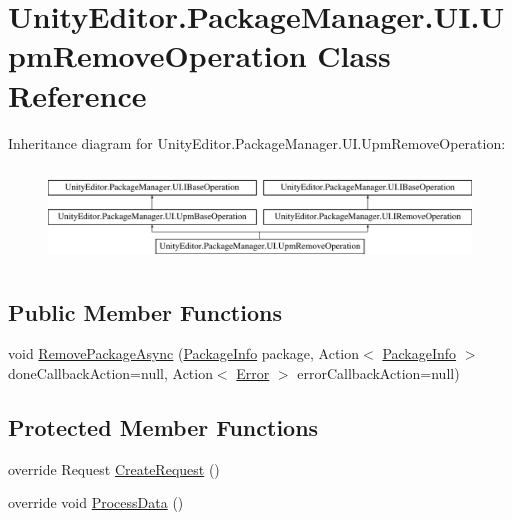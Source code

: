 \hypertarget{class_unity_editor_1_1_package_manager_1_1_u_i_1_1_upm_remove_operation}{}\section{Unity\+Editor.\+Package\+Manager.\+U\+I.\+Upm\+Remove\+Operation Class Reference}
\label{class_unity_editor_1_1_package_manager_1_1_u_i_1_1_upm_remove_operation}
Inheritance diagram for Unity\+Editor.\+Package\+Manager.\+U\+I.\+Upm\+Remove\+Operation\+:\begin{figure}[H]
\begin{center}
\leavevmode
\includegraphics[height=2.553191cm]{class_unity_editor_1_1_package_manager_1_1_u_i_1_1_upm_remove_operation}
\end{center}
\end{figure}
\subsection*{Public Member Functions}
\begin{DoxyCompactItemize}
\item 
void \mbox{\hyperlink{class_unity_editor_1_1_package_manager_1_1_u_i_1_1_upm_remove_operation_ae89c3c2cc15ae8f769276685b775eea6}{Remove\+Package\+Async}} (\mbox{\hyperlink{class_unity_editor_1_1_package_manager_1_1_u_i_1_1_package_info}{Package\+Info}} package, Action$<$ \mbox{\hyperlink{class_unity_editor_1_1_package_manager_1_1_u_i_1_1_package_info}{Package\+Info}} $>$ done\+Callback\+Action=null, Action$<$ \mbox{\hyperlink{class_unity_editor_1_1_package_manager_1_1_u_i_1_1_upm_base_operation_a116dcc466d587905084e826b47f7e05b}{Error}} $>$ error\+Callback\+Action=null)
\end{DoxyCompactItemize}
\subsection*{Protected Member Functions}
\begin{DoxyCompactItemize}
\item 
override Request \mbox{\hyperlink{class_unity_editor_1_1_package_manager_1_1_u_i_1_1_upm_remove_operation_acc7b7b33d5e447aebc7cb9545f39eefb}{Create\+Request}} ()
\item 
override void \mbox{\hyperlink{class_unity_editor_1_1_package_manager_1_1_u_i_1_1_upm_remove_operation_abb635a83eb84f843c45a9631d4dc782f}{Process\+Data}} ()
\end{DoxyCompactItemize}
